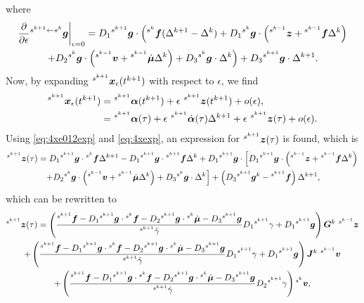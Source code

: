 \documentclass[../DC2017114Bouma.tex]{subfiles}
\begin{document}
where
\begin{multline}
\left.\frac{\partial}{\partial\epsilon}\ls^{s^{k+1}\leftarrow s^k}\gb\right|_{\epsilon=0} = D_1\ls^{s^{k+1}}\gb\cdot\left(\ls^{s^{k}}\fb(\Delta^{k+1}-\Delta^{k}) + D_1\ls^{s^{k}}\gb\cdot\left(\ls^{s^{k-1}}\zb+\ls^{s^{k-1}}\fb\Delta^{k}\right)\right. \\ \left.+ D_2\ls^{s^{k}}\gb\cdot\left(\ls^{s^{k-1}}\vb+\ls^{s^{k-1}}\dot{\mub}\Delta^{k}\right) + D_3\ls^{s^{k}}\gb\cdot\Delta^{k}\right)+D_3\ls^{s^{k+1}}\gb\cdot\Delta^{k+1}. \label{eq:4dg1de}
\end{multline}
Now, by expanding $\ls^{s^{k+1}}\xb_\epsilon(t^{k+1})$ with respect to $\epsilon$, we find
\begin{align}
\ls^{s^{k+1}}\xb_\epsilon(t^{k+1}) &= \ls^{s^{k+1}}\alphab(t^{k+1})+\epsilon\ ^{s^{k+1}}\zb(t^{k+1}) + o(\epsilon),\\
&= \ls^{s^{k+1}}\alphab(\tau) + \epsilon\ ^{s^{k+1}}\dot{\alphab}(\tau)\Delta^{k+1} + \epsilon\ ^{s^{k+1}}\zb(\tau) + o(\epsilon).\label{eq:4xexp}
\end{align}
Using \eqref{eq:4xe012exp} and \eqref{eq:4xexp}, an expression for $\ls^{s^{k+1}}\zb(\tau)$ is found, which is
\begin{multline}
\ls^{s^{k+1}}\zb(\tau) = D_1\ls^{s^{k+1}}\gb\cdot\ls^{s^{k}}\fb\Delta^{k+1} - D_1\ls^{s^{k+1}}\gb\cdot\ls^{s^{k+1}}\fb\Delta^{k} + D_1\ls^{s^{k+1}}\gb\cdot\left[D_1\ls^{s^{k+1}}\gb\cdot\left(\ls^{s^{k-1}}\zb+\ls^{s^{k-1}}\fb\Delta^{k}\right)\right.\\
\left.+D_2\ls^{s^{k}}\gb\cdot\left(\ls^{s^{k-1}}\vb+\ls^{s^{k-1}}\dot{\mub}\Delta^{k}\right)+D_3\ls^{s^{k}}\gb\cdot\Delta^{k}\right] + \left(D_3\ls^{s^{k+1}}\gb^{k} - \ls^{s^{k+1}}\fb\right)\Delta^{k+1},\label{eq:4ztau}
\end{multline}
which can be rewritten to 
\begin{multline}
\ls^{s^{k+1}}\zb(\tau) = \left(\frac{\ls^{s^{k+1}}\fb - D_1\ls^{s^{k+1}}\gb\cdot\ls^{s^{k}}\fb  - D_2\ls^{s^{k+1}}\gb\cdot\ls^{s^{k}}\dot{\mub} - D_3\ls^{s^{k+1}}\gb}{\ls^{s^{k+1}}\dot{\gamma}}D_1\ls^{s^{k+1}}\gamma + D_1\ls^{s^{k+1}}\gb\right)\Gb^{k}\ ^{s^{k-1}}\zb\\
+ \left(\frac{\ls^{s^{k+1}}\fb - D_1\ls^{s^{k+1}}\gb\cdot\ls^{s^{k}}\fb - D_2\ls^{s^{k+1}}\gb\cdot\ls^{s^{k}}\dot{\mub} - D_3\ls^{s^{k+1}}\gb}{\ls^{s^{k+1}}\dot{\gamma}}D_1\ls^{s^{k+1}}\gamma + D_1\ls^{s^{k+1}}\gb\right)\Jb^{k}\ ^{s^{k-1}}\vb\\
+ \left(\frac{\ls^{s^{k+1}}\fb-D_1\ls^{s^{k+1}}\gb\cdot\ls^{s^{k}}\fb - D_2\ls^{s^{k+1}}\gb\cdot\ls^{s^{k}}\dot{\mub} - D_3\ls^{s^{k+1}}\gb}{\ls^{s^{k+1}}\dot{\gamma}}D_2\ls^{s^{k+1}}\gamma\right)\ls^{s^{k}}\vb,
\end{multline}
\end{document}
